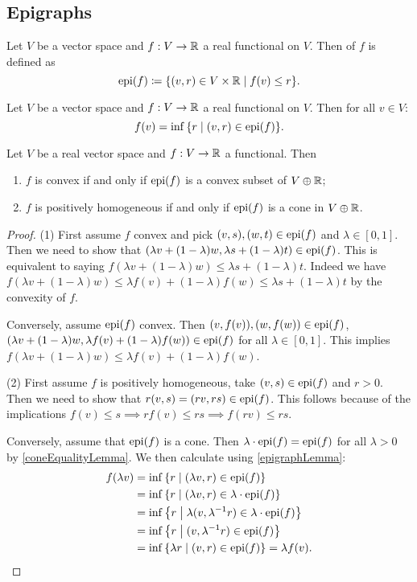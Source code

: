 \subsection{Epigraphs}
\begin{definition}
Let $V$ be a vector space and $f: V\to \mathbb{R}$ a real functional on $V$. Then  of $f$ is defined as
\[ \epigraph(f) \defeq \setbuilder{(v,r)\in V\times \R}{f(v)\leq r}. \]
\end{definition}

\begin{lemma} \label{epigraphLemma}
Let $V$ be a vector space and $f: V\to \mathbb{R}$ a real functional on $V$. Then for all $v\in V$:
\[ f(v) = \inf\setbuilder{r}{(v,r)\in \epigraph(f)}. \]
\end{lemma}

\begin{proposition}
Let $V$ be a real vector space and $f: V\to \mathbb{R}$ a functional. Then
\begin{enumerate}
\item $f$ is convex \textup{if and only if} $\operatorname{epi}(f)$ is a convex subset of $V\oplus \mathbb{R}$;
\item $f$ is positively homogeneous \textup{if and only if} $\operatorname{epi}(f)$ is a cone in $V\oplus \mathbb{R}$.
\end{enumerate}
\end{proposition}
\begin{proof}
(1) First assume $f$ convex and pick $(v, s), (w,t)\in \operatorname{epi}(f)$ and $\lambda\in [0,1]$. Then we need to show that $(\lambda v + (1-\lambda)w, \lambda s + (1-\lambda)t) \in \operatorname{epi}(f)$. This is equivalent to saying $f(\lambda v + (1-\lambda)w) \leq \lambda s + (1-\lambda)t$. Indeed we have $f(\lambda v + (1-\lambda)w) \leq \lambda f(v) + (1-\lambda)f(w) \leq \lambda s + (1-\lambda)t$ by the convexity of $f$.

Conversely, assume $\operatorname{epi}(f)$ convex. Then $(v, f(v)), (w,f(w))\in \operatorname{epi}(f)$, $(\lambda v + (1-\lambda)w, \lambda f(v) + (1-\lambda)f(w)) \in \operatorname{epi}(f)$ for all $\lambda\in [0,1]$. This implies $f(\lambda v + (1-\lambda)w) \leq \lambda f(v) + (1-\lambda)f(w)$.

(2) First assume $f$ is positively homogeneous, take $(v,s)\in \operatorname{epi}(f)$ and $r>0$. Then we need to show that $r(v,s) = (rv,rs)\in \operatorname{epi}(f)$. This follows because of the implications $f(v)\leq s \implies rf(v) \leq rs \implies f(rv) \leq rs$.

Conversely, assume that $\operatorname{epi}(f)$ is a cone. Then $\lambda\cdot \operatorname{epi}(f) = \operatorname{epi}(f)$ for all $\lambda>0$ by \ref{coneEqualityLemma}. We then calculate using \ref{epigraphLemma}:
\begin{align*}
f(\lambda v) &= \inf\setbuilder{r}{(\lambda v,r)\in \epigraph(f)} \\
&= \inf\setbuilder{r}{(\lambda v,r)\in \lambda\cdot\epigraph(f)} \\
&= \inf\setbuilder{r}{\lambda(v,\lambda^{-1}r)\in \lambda\cdot\epigraph(f)} \\
&= \inf\setbuilder{r}{(v,\lambda^{-1}r)\in \epigraph(f)} \\
&= \inf\setbuilder{\lambda r}{(v,r)\in \epigraph(f)} = \lambda f(v).
\end{align*} 
\end{proof}
